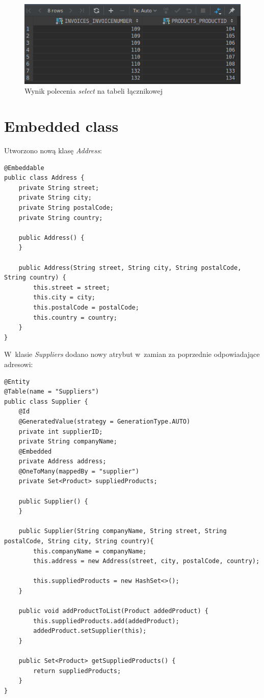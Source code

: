 \documentclass[12pt, a4paper]{mwart}
\begin{document}
\begin{figure}[ht]
  \centering
  \includegraphics[scale=0.5]{IX/9-2.png}
  \caption{Wynik polecenia \textit{select} na tabeli łącznikowej}
  \label{rys:9.2}
\end{figure}

\clearpage
\section{Embedded class}

Utworzono nową klasę \textit{Address}:
\begin{lstlisting}
@Embeddable
public class Address {
    private String street;
    private String city;
    private String postalCode;
    private String country;

    public Address() {
    }

    public Address(String street, String city, String postalCode, String country) {
        this.street = street;
        this.city = city;
        this.postalCode = postalCode;
        this.country = country;
    }
}
\end{lstlisting}

W~klasie \textit{Suppliers} dodano nowy atrybut w~zamian za poprzednie odpowiadające adresowi:
\begin{lstlisting}
@Entity
@Table(name = "Suppliers")
public class Supplier {
    @Id
    @GeneratedValue(strategy = GenerationType.AUTO)
    private int supplierID;
    private String companyName;
    @Embedded
    private Address address;
    @OneToMany(mappedBy = "supplier")
    private Set<Product> suppliedProducts;

    public Supplier() {
    }

    public Supplier(String companyName, String street, String postalCode, String city, String country){
        this.companyName = companyName;
        this.address = new Address(street, city, postalCode, country);

        this.suppliedProducts = new HashSet<>();
    }

    public void addProductToList(Product addedProduct) {
        this.suppliedProducts.add(addedProduct);
        addedProduct.setSupplier(this);
    }

    public Set<Product> getSuppliedProducts() {
        return suppliedProducts;
    }
}
\end{lstlisting}
\end{document}
